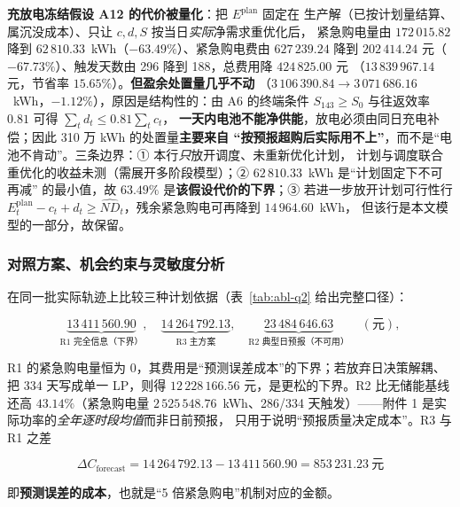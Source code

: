 \textbf{充放电冻结假设 A12 的代价被量化}：把 \(E^{\text{plan}}\) 固定在
生产解（已按计划量结算、属沉没成本）、只让 \(c,d,S\) 按当日\emph{实际}净需求重优化后，
紧急购电量由 \(172\,015.82\) 降到 \(62\,810.33\)~kWh（\(-63.49\%\)）、紧急购电费由 \(627\,239.24\)
降到 \(202\,414.24\) 元（\(-67.73\%\)）、触发天数由 296 降到 188，总费用降 \(424\,825.00\) 元
（\(13\,839\,967.14\) 元，节省率 \(15.65\%\)）。\textbf{但盈余处置量几乎不动}
（\(3\,106\,390.84\to3\,071\,686.16\)~kWh，\(-1.12\%\)），原因是结构性的：由 A6 的终端条件
\(S_{143}\ge S_0\) 与往返效率 \(0.81\) 可得 \(\sum_td_t\le0.81\sum_tc_t\)，
\textbf{一天内电池不能净供能}，放电必须由同日充电补偿；因此 310 万 kWh 的处置量\textbf{主要来自
“按预报超购后实际用不上”}，而不是“电池不肯动”。三条边界：① 本行\emph{只}放开调度、未重新优化计划，
计划与调度联合重优化的收益未测（需展开多阶段模型）；② \(62\,810.33\)~kWh 是“计划固定下不可再减”
的最小值，故 \(63.49\%\) 是\textbf{该假设代价的下界}；③ 若进一步放开计划可行性行
\(E^{\text{plan}}_t-c_t+d_t\ge\widehat{ND}_t\)，残余紧急购电可再降到 \(14\,964.60\)~kWh，
但该行是本文模型的一部分，故保留。

\subsubsection{对照方案、机会约束与灵敏度分析}\label{sec:q2-compare}\label{sec:q2-chance}
在同一批实际轨迹上比较三种计划依据（表~\ref{tab:abl-q2} 给出完整口径）：

\begin{equation}
  \underbrace{13\,411\,560.90}_{\text{R1 完全信息（下界）}},\quad
  \underbrace{14\,264\,792.13}_{\text{R3 主方案}},\quad
  \underbrace{23\,484\,646.63}_{\text{R2 典型日预报（不可用）}}\quad(\text{元}),
  \label{eq:q2-compare}
\end{equation}

R1 的紧急购电量恒为 0，其费用是“预测误差成本”的下界；若放弃日决策解耦、把 334 天写成单一
LP，则得 \(12\,228\,166.56\) 元，是更松的下界。R2 比无储能基线还高 \(43.14\%\)（紧急购电量
\(2\,525\,548.76\)~kWh、286/334 天触发）——附件 1 是实际功率的\emph{全年逐时段均值}而非日前预报，
只用于说明“预报质量决定成本”。R3 与 R1 之差

\begin{equation}
  \Delta C_{\text{forecast}}=14\,264\,792.13-13\,411\,560.90=853\,231.23\ \text{元}
  \label{eq:q2-forecasterr}
\end{equation}

即\textbf{预测误差的成本}，也就是“5 倍紧急购电”机制对应的金额。


